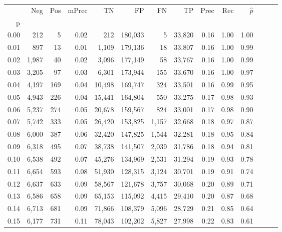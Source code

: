 \begin{tabular}{rrrrrrrrrrrrrr}
\toprule
{} &    Neg &  Pos & mPrec &       TN &       FP &      FN &      TP &  Prec &   Rec & $\hat{p}$ \\
p    &        &      &       &          &          &         &         &       &       &           \\
\midrule
0.00 &    212 &    5 &  0.02 &      212 &  180,033 &       5 &  33,820 &  0.16 &  1.00 &      1.00 \\
0.01 &    897 &   13 &  0.01 &    1,109 &  179,136 &      18 &  33,807 &  0.16 &  1.00 &      0.99 \\
0.02 &  1,987 &   40 &  0.02 &    3,096 &  177,149 &      58 &  33,767 &  0.16 &  1.00 &      0.99 \\
0.03 &  3,205 &   97 &  0.03 &    6,301 &  173,944 &     155 &  33,670 &  0.16 &  1.00 &      0.97 \\
0.04 &  4,197 &  169 &  0.04 &   10,498 &  169,747 &     324 &  33,501 &  0.16 &  0.99 &      0.95 \\
0.05 &  4,943 &  226 &  0.04 &   15,441 &  164,804 &     550 &  33,275 &  0.17 &  0.98 &      0.93 \\
0.06 &  5,237 &  274 &  0.05 &   20,678 &  159,567 &     824 &  33,001 &  0.17 &  0.98 &      0.90 \\
0.07 &  5,742 &  333 &  0.05 &   26,420 &  153,825 &   1,157 &  32,668 &  0.18 &  0.97 &      0.87 \\
0.08 &  6,000 &  387 &  0.06 &   32,420 &  147,825 &   1,544 &  32,281 &  0.18 &  0.95 &      0.84 \\
0.09 &  6,318 &  495 &  0.07 &   38,738 &  141,507 &   2,039 &  31,786 &  0.18 &  0.94 &      0.81 \\
0.10 &  6,538 &  492 &  0.07 &   45,276 &  134,969 &   2,531 &  31,294 &  0.19 &  0.93 &      0.78 \\
0.11 &  6,654 &  593 &  0.08 &   51,930 &  128,315 &   3,124 &  30,701 &  0.19 &  0.91 &      0.74 \\
0.12 &  6,637 &  633 &  0.09 &   58,567 &  121,678 &   3,757 &  30,068 &  0.20 &  0.89 &      0.71 \\
0.13 &  6,586 &  658 &  0.09 &   65,153 &  115,092 &   4,415 &  29,410 &  0.20 &  0.87 &      0.68 \\
0.14 &  6,713 &  681 &  0.09 &   71,866 &  108,379 &   5,096 &  28,729 &  0.21 &  0.85 &      0.64 \\
0.15 &  6,177 &  731 &  0.11 &   78,043 &  102,202 &   5,827 &  27,998 &  0.22 &  0.83 &      0.61 \\

\end{tabular}
